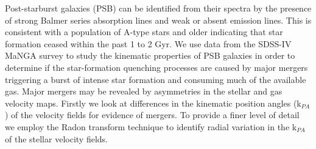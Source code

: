 
Post-starburst galaxies (PSB) can be identified from their spectra by the presence of strong Balmer series absorption lines and weak or absent emission lines. This is consistent with a population of A-type stars and older indicating that star formation ceased within the past 1 to 2 Gyr. We use data from the SDSS-IV MaNGA survey to study the kinematic properties of PSB galaxies in order to determine if the star-formation quenching processes are caused by major mergers triggering a burst of intense star formation and consuming much of the available gas. Major mergers may be revealed by asymmetries in the stellar and gas velocity maps. Firstly we look at differences in the kinematic position angles (k$_{PA}$) of the velocity fields for evidence of mergers. To provide a finer level of detail we employ the Radon transform technique to identify radial variation in the k$_{PA}$ of the stellar velocity fields.


